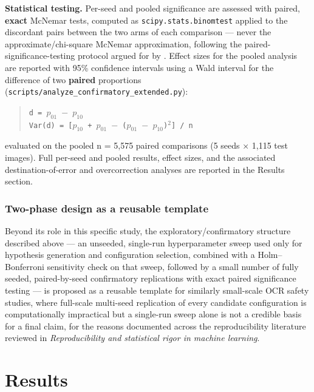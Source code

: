 \documentclass[fleqn,10pt]{wlpeerj}
\begin{document}
\textbf{Statistical testing.} Per-seed and pooled significance are assessed with paired, \textbf{exact} McNemar tests, computed as \texttt{scipy.stats.binomtest} applied to the discordant pairs between the two arms of each comparison --- never the approximate/chi-square McNemar approximation, following the paired-significance-testing protocol argued for by \citet{dror2018hitchhikers}. Effect sizes for the pooled analysis are reported with 95\% confidence intervals using a Wald interval for the difference of two \textbf{paired} proportions (\texttt{scripts/\allowbreak analyze\_confirmatory\_extended.py}):

\begin{quote}
\texttt{d = $p_{01}$ $-$ $p_{10}$}\\
\texttt{Var(d) = [$p_{10}$ + $p_{01}$ $-$ ($p_{01}$ $-$ $p_{10}$)$^2$] / n}
\end{quote}

evaluated on the pooled n = 5,575 paired comparisons (5 seeds × 1,115 test images). Full per-seed and pooled results, effect sizes, and the associated destination-of-error and overcorrection analyses are reported in the Results section.

\subsubsection*{Two-phase design as a reusable template}\label{sec:two-phase-template}

Beyond its role in this specific study, the exploratory/confirmatory structure described above --- an unseeded, single-run hyperparameter sweep used only for hypothesis generation and configuration selection, combined with a Holm--Bonferroni sensitivity check on that sweep, followed by a small number of fully seeded, paired-by-seed confirmatory replications with exact paired significance testing --- is proposed as a reusable template for similarly small-scale OCR safety studies, where full-scale multi-seed replication of every candidate configuration is computationally impractical but a single-run sweep alone is not a credible basis for a final claim, for the reasons documented across the reproducibility literature reviewed in \textit{Reproducibility and statistical rigor in machine learning}.

\section*{Results}\label{sec:results}
\end{document}
